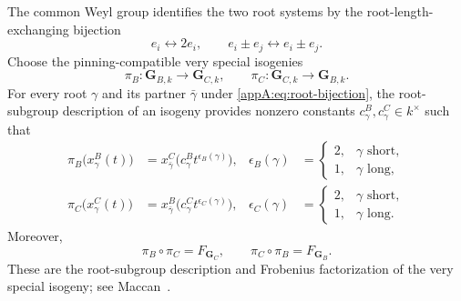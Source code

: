 \documentclass[11pt,a4paper,oneside]{amsart}
\numberwithin{equation}{section}
\theoremstyle{definition}
\theoremstyle{remark}
\begin{document}
The common Weyl group identifies the two root systems by the root-length-exchanging
bijection
\begin{equation}
\label{appA:eq:root-bijection}
 e_i\longleftrightarrow 2e_i,
 \qquad
 e_i\pm e_j\longleftrightarrow e_i\pm e_j.
\end{equation}
Choose the pinning-compatible very special isogenies
\[
 \pi_B:\mathbf G_{B,k}\longrightarrow\mathbf G_{C,k},
 \qquad
 \pi_C:\mathbf G_{C,k}\longrightarrow\mathbf G_{B,k}.
\]
For every root $\gamma$ and its partner $\bar\gamma$ under
\eqref{appA:eq:root-bijection}, the root-subgroup description of an isogeny
provides nonzero constants $c^B_\gamma,c^C_\gamma\in k^\times$ such that
\begin{align}
 \pi_B\bigl(x^B_\gamma(t)\bigr)
 &=x^C_{\bar\gamma}\bigl(c^B_\gamma
   t^{\epsilon_B(\gamma)}\bigr),
 &\epsilon_B(\gamma)&=
 \begin{cases}2,&\gamma\text{ short},\\1,&\gamma\text{ long},\end{cases}
 \label{appA:eq:root-map-B}\\
 \pi_C\bigl(x^C_\gamma(t)\bigr)
 &=x^B_{\bar\gamma}\bigl(c^C_\gamma
   t^{\epsilon_C(\gamma)}\bigr),
 &\epsilon_C(\gamma)&=
 \begin{cases}2,&\gamma\text{ short},\\1,&\gamma\text{ long}.
 \end{cases}
 \label{appA:eq:root-map-C}
\end{align}
Moreover,
\begin{equation}
\label{appA:eq:group-Frobenius-factorizations}
 \pi_B\circ\pi_C=F_{\mathbf G_C},
 \qquad
 \pi_C\circ\pi_B=F_{\mathbf G_B}.
\end{equation}
These are the root-subgroup description and Frobenius factorization of the
very special isogeny; see Maccan~\cite[equation~(1.2) and
Proposition~1.10]{Maccan26}.
\end{document}
